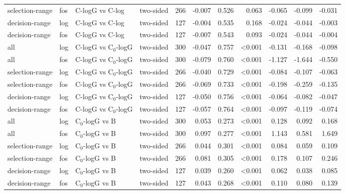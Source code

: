 \begin{longtable}{llllrrrrrrr}
selection-range & fos & C-logG vs C-log & two-sided & 266 & -0.007 & 0.526 & 0.063 & -0.065 & -0.099 & -0.031 \\
decision-range & log & C-logG vs C-log & two-sided & 127 & -0.004 & 0.535 & 0.168 & -0.024 & -0.044 & -0.003 \\
decision-range & fos & C-logG vs C-log & two-sided & 127 & -0.007 & 0.543 & 0.093 & -0.024 & -0.044 & -0.004 \\
all & log & C-logG vs C$_0$-logG & two-sided & 300 & -0.047 & 0.757 & <0.001 & -0.131 & -0.168 & -0.098 \\
all & fos & C-logG vs C$_0$-logG & two-sided & 300 & -0.079 & 0.760 & <0.001 & -1.127 & -1.644 & -0.550 \\
selection-range & log & C-logG vs C$_0$-logG & two-sided & 266 & -0.040 & 0.729 & <0.001 & -0.084 & -0.107 & -0.063 \\
selection-range & fos & C-logG vs C$_0$-logG & two-sided & 266 & -0.069 & 0.733 & <0.001 & -0.198 & -0.259 & -0.135 \\
decision-range & log & C-logG vs C$_0$-logG & two-sided & 127 & -0.050 & 0.756 & <0.001 & -0.064 & -0.082 & -0.047 \\
decision-range & fos & C-logG vs C$_0$-logG & two-sided & 127 & -0.057 & 0.764 & <0.001 & -0.097 & -0.119 & -0.074 \\
all & log & C$_0$-logG vs B & two-sided & 300 & 0.053 & 0.273 & <0.001 & 0.128 & 0.092 & 0.168 \\
all & fos & C$_0$-logG vs B & two-sided & 300 & 0.097 & 0.277 & <0.001 & 1.143 & 0.581 & 1.649 \\
selection-range & log & C$_0$-logG vs B & two-sided & 266 & 0.044 & 0.301 & <0.001 & 0.084 & 0.059 & 0.109 \\
selection-range & fos & C$_0$-logG vs B & two-sided & 266 & 0.081 & 0.305 & <0.001 & 0.178 & 0.107 & 0.246 \\
decision-range & log & C$_0$-logG vs B & two-sided & 127 & 0.039 & 0.260 & <0.001 & 0.062 & 0.038 & 0.085 \\
decision-range & fos & C$_0$-logG vs B & two-sided & 127 & 0.043 & 0.268 & <0.001 & 0.110 & 0.080 & 0.139 \\
\end{longtable}
\endgroup
